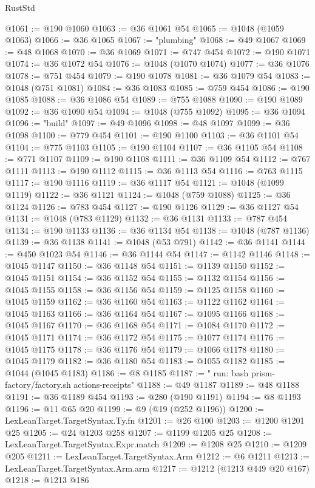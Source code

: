 \begin{lexlean}{RustStd}
\begin{coremodule}
@1061 := @190 @1060
@1063 := @36 @1061 @54
@1065 := @1048 (@1059 @1063)
@1066 := @36 @1065
@1067 := "plumbing"
@1068 := @49 @1067
@1069 := @48 @1068
@1070 := @36 @1069
@1071 := @747 @454
@1072 := @190 @1071
@1074 := @36 @1072 @54
@1076 := @1048 (@1070 @1074)
@1077 := @36 @1076
@1078 := @751 @454
@1079 := @190 @1078
@1081 := @36 @1079 @54
@1083 := @1048 (@751 @1081)
@1084 := @36 @1083
@1085 := @759 @454
@1086 := @190 @1085
@1088 := @36 @1086 @54
@1089 := @755 @1088
@1090 := @190 @1089
@1092 := @36 @1090 @54
@1094 := @1048 (@755 @1092)
@1095 := @36 @1094
@1096 := "build"
@1097 := @49 @1096
@1098 := @48 @1097
@1099 := @36 @1098
@1100 := @779 @454
@1101 := @190 @1100
@1103 := @36 @1101 @54
@1104 := @775 @1103
@1105 := @190 @1104
@1107 := @36 @1105 @54
@1108 := @771 @1107
@1109 := @190 @1108
@1111 := @36 @1109 @54
@1112 := @767 @1111
@1113 := @190 @1112
@1115 := @36 @1113 @54
@1116 := @763 @1115
@1117 := @190 @1116
@1119 := @36 @1117 @54
@1121 := @1048 (@1099 @1119)
@1122 := @36 @1121
@1124 := @1048 (@759 @1088)
@1125 := @36 @1124
@1126 := @783 @454
@1127 := @190 @1126
@1129 := @36 @1127 @54
@1131 := @1048 (@783 @1129)
@1132 := @36 @1131
@1133 := @787 @454
@1134 := @190 @1133
@1136 := @36 @1134 @54
@1138 := @1048 (@787 @1136)
@1139 := @36 @1138
@1141 := @1048 (@53 @791)
@1142 := @36 @1141
@1144 := @450 @1023 @54
@1146 := @36 @1144 @54
@1147 := @1142 @1146
@1148 := @1045 @1147
@1150 := @36 @1148 @54
@1151 := @1139 @1150
@1152 := @1045 @1151
@1154 := @36 @1152 @54
@1155 := @1132 @1154
@1156 := @1045 @1155
@1158 := @36 @1156 @54
@1159 := @1125 @1158
@1160 := @1045 @1159
@1162 := @36 @1160 @54
@1163 := @1122 @1162
@1164 := @1045 @1163
@1166 := @36 @1164 @54
@1167 := @1095 @1166
@1168 := @1045 @1167
@1170 := @36 @1168 @54
@1171 := @1084 @1170
@1172 := @1045 @1171
@1174 := @36 @1172 @54
@1175 := @1077 @1174
@1176 := @1045 @1175
@1178 := @36 @1176 @54
@1179 := @1066 @1178
@1180 := @1045 @1179
@1182 := @36 @1180 @54
@1183 := @1055 @1182
@1185 := @1044 (@1045 @1183)
@1186 := @8 @1185
@1187 := "        run: bash prism-factory/factory.sh actions-receipts"
@1188 := @49 @1187
@1189 := @48 @1188
@1191 := @36 @1189 @454
@1193 := @280 (@190 @1191)
@1194 := @8 @1193
@1196 := @11 @65 @20
@1199 := @9 (@19 (@252 @1196))
@1200 := LexLeanTarget.TargetSyntax.Ty.fn
@1201 := @26 @100
@1203 := @1200 @1201 @25
@1205 := @24 @1203 @258
@1207 := @1199 @1205 @25
@1208 := LexLeanTarget.TargetSyntax.Expr.match
@1209 := @1208 @25
@1210 := @1209 @205
@1211 := LexLeanTarget.TargetSyntax.Arm
@1212 := @6 @1211
@1213 := LexLeanTarget.TargetSyntax.Arm.arm
@1217 := @1212 (@1213 @449 @20 @167)
@1218 := @1213 @186

\end{coremodule}
\end{lexlean}
